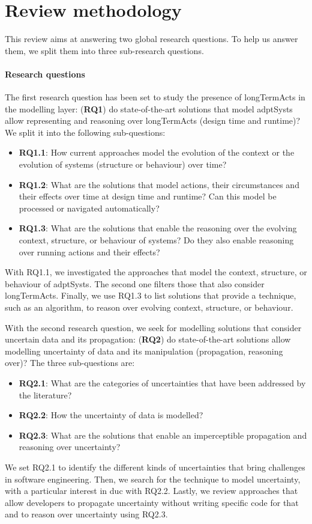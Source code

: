\section{Review methodology}
\label{sec:sota:methodo}

This review aims at answering two global research questions.
To help us answer them, we split them into three sub-research questions.

\paragraph{Research questions}
The first research question has been set to study the presence of \glspl{longTermAct} in the modelling layer: (\textbf{RQ1}) do state-of-the-art solutions that model \glspl{adptSyst} allow representing and reasoning over \glspl{longTermAct} (design time and runtime)? 
We split it into the following sub-questions:
\begin{itemize}
	\item \textbf{RQ1.1}: How current approaches model the evolution of the \gls{context} or the evolution of systems (\gls{structure} or \gls{behaviour}) over time?
	\item \textbf{RQ1.2}: What are the solutions that model \glspl{action}, their \glspl{circumstance} and their effects over time at design time and runtime? Can this model be processed or navigated automatically?
	\item \textbf{RQ1.3}: What are the solutions that enable the reasoning over the evolving \gls{context}, \gls{structure}, or \gls{behaviour} of systems? Do they also enable reasoning over running \glspl{action} and their effects?
\end{itemize}
With RQ1.1, we investigated the approaches that model the \gls{context}, \gls{structure}, or \gls{behaviour} of \glspl{adptSyst}.
The second one filters those that also consider \glspl{longTermAct}.
Finally, we use RQ1.3 to list solutions that provide a technique, such as an algorithm, to reason over evolving \gls{context}, \gls{structure}, or \gls{behaviour}.

With the second research question, we seek for modelling solutions that consider uncertain data and its propagation: (\textbf{RQ2}) do state-of-the-art solutions allow modelling uncertainty of data and its manipulation (propagation, reasoning over)?
The three sub-questions are:
\begin{itemize}
	\item \textbf{RQ2.1}: What are the categories of uncertainties that have been addressed by the literature?
	\item \textbf{RQ2.2}: How the uncertainty of data is modelled?
	\item \textbf{RQ2.3}: What are the solutions that enable an imperceptible propagation and reasoning over uncertainty?
\end{itemize}
We set RQ2.1 to identify the different kinds of uncertainties that bring challenges in software engineering.
Then, we search for the technique to model uncertainty, with a particular interest in \gls{duc} with RQ2.2.
Lastly, we review approaches that allow developers to propagate uncertainty without writing specific code for that and to reason over uncertainty using RQ2.3.

